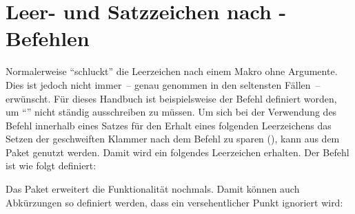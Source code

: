 \section{Leer- und Satzzeichen nach -Befehlen}%
\label{sec:tips:xspace}
%
Normalerweise \enquote{schluckt}  die Leerzeichen nach einem 
Makro ohne Argumente. Dies ist jedoch nicht immer~-- genau genommen in den 
seltensten Fällen~-- erwünscht. Für dieses Handbuch ist beispielsweise der 
Befehl  definiert worden, um \enquote{\TUD{}} nicht ständig 
ausschreiben zu müssen. Um sich bei der Verwendung des Befehl innerhalb eines 
Satzes für den Erhalt eines folgenden Leerzeichens das Setzen der geschweiften 
Klammer nach dem Befehl zu sparen (\PParameter{}), kann 
 aus dem Paket  genutzt werden. Damit wird 
ein folgendes Leerzeichen erhalten. Der Befehl  ist wie folgt 
definiert:
%
\begin{quoting}
\begin{Code}
\newcommand*\TUD{Technische Universit\"at Dresden\xspace}
\end{Code}
\end{quoting}
%
Das Paket  erweitert die Funktionalität nochmals. Damit 
können auch Abkürzungen so definiert werden, dass ein versehentlicher Punkt 
ignoriert wird:
%
\begin{quoting}
\begin{Code}
\newcommand*\zB{z.\,B\xperiod}
\end{Code}
\end{quoting}



